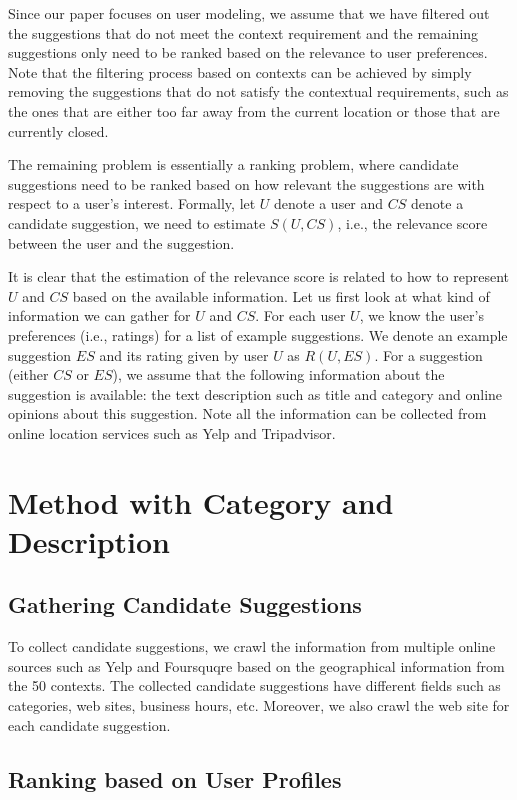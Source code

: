 Since our paper focuses on user modeling, we assume 
that we have filtered out the suggestions that do not meet the context requirement 
and the remaining suggestions
only need to be ranked based on the relevance to 
user preferences. Note that the filtering process 
based on contexts can be achieved by simply removing 
the suggestions that do not satisfy the contextual 
requirements, such as the ones that are either 
too far away from the current location or those 
that are currently closed. 

The remaining problem is essentially a ranking 
problem, where candidate suggestions need to 
be ranked based on how relevant the suggestions
are with respect to a user's interest. 
Formally, let $U$ denote a user and $CS$ denote a 
candidate suggestion, we need to estimate 
$S(U,CS)$, i.e., the relevance score between 
the user and the suggestion. 

It is clear that the estimation of the relevance 
score is related to how to represent $U$ 
and $CS$ based on the available information. 
Let us first look at what kind of 
information we can gather for $U$ and $CS$.  
For each user $U$, 
we know the user's preferences (i.e., ratings) for a list of 
example suggestions. We denote an example suggestion $ES$ 
and its rating given by user $U$ as $R(U,ES)$.  For a 
suggestion (either $CS$ or $ES$), we assume that the 
following information about the suggestion is available: 
the text description such as title and category and online 
opinions about this suggestion. 
Note all the information can be collected from online location 
services such as Yelp and Tripadvisor. 


\section{Method with Category and Description}

\subsection{Gathering Candidate Suggestions}
To collect candidate suggestions, we crawl the information 
from multiple online sources such as Yelp and Foursquqre 
based on the geographical information from the 50 contexts. 
The collected candidate suggestions have different fields
such as categories, web sites, business hours, etc. 
Moreover, we also crawl the web site for each candidate 
suggestion. 

\subsection{Ranking based on User Profiles}

